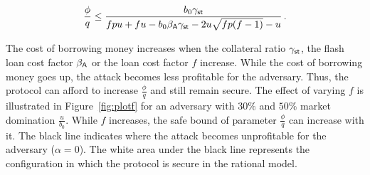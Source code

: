 \begin{gather*}
  \frac{\phi}{q} \leq \frac{b_0 \gamma_{\textsf{st}}}{f p u + f u - b_0 \beta_{\textsf{A}} \gamma_{\textsf{st}} - 2 u \sqrt{fp (f-1)} - u}\,.
\end{gather*}

The cost of borrowing money increases when the collateral ratio
$\gamma_{\textsf{st}}$, the flash loan cost factor $\beta_{\textsf{A}}$ or the loan cost factor $f$
increase. While the cost of borrowing money goes up, the attack becomes less profitable
for the adversary. Thus, the protocol can afford to increase $\frac{\phi}{q}$
and still remain secure. The effect of varying $f$ is illustrated in
Figure~\ref{fig:plotf} for an adversary with $30\%$ and $50\%$ market domination $\frac{u}{b_0}$.
While $f$ increases, the safe bound of parameter $\frac{\phi}{q}$ can increase with it.
The black line indicates where the attack becomes unprofitable for the adversary ($\alpha = 0$).
The white area under the black line represents the configuration in which
the protocol is secure in the rational model.

